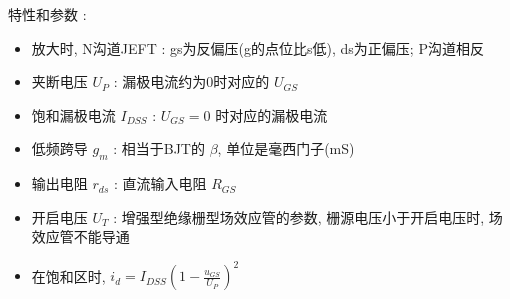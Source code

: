 \documentclass[UTF8, 12pt]{ctexart}
\begin{document}
	特性和参数 :
	\begin{itemize}[leftmargin = 4em]
		\item 放大时, N沟道JEFT : gs为反偏压(g的点位比s低), ds为正偏压; P沟道相反
		\item 夹断电压 $ U_{P} $ : 漏极电流约为0时对应的 $ U_{GS} $
		\item 饱和漏极电流 $ I_{DSS} $ : $ U_{GS} = 0 $ 时对应的漏极电流
		\item 低频跨导 $ g_{m} $ : 相当于BJT的 $ \beta $, 单位是毫西门子(mS)
		\item 输出电阻 $ r_{ds} $ : 直流输入电阻 $ R_{GS} $
		\item 开启电压 $ U_{T} $ : 增强型绝缘栅型场效应管的参数, 栅源电压小于开启电压时, 场效应管不能导通
		\item 在饱和区时, $ i_{d} = I_{DSS}(1-\frac{u_{GS}}{U_{P}})^{2} $
	\end{itemize}
\end{document}
